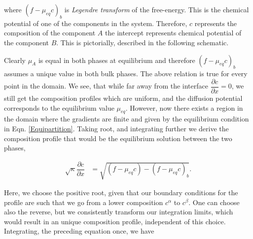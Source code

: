 \documentclass[english]{iambook}
\begin{document}
where $\left(f - \mu_{eq}c\right)_b$ is \textit{Legendre transform} of
the free-energy. This is the chemical potential of one of the components
in the system. Therefore, $c$ represents the composition of the 
component $A$ the intercept represents chemical potential of
the component $B$. This is pictorially, described in the following
schematic.

 \begin{center}
  \end{center}

Clearly $\mu_A$ is equal in both phases at equilibrium
and therefore $\left(f - \mu_{eq}c\right)_b$ assumes
a unique value in both bulk phases. The above relation 
is true for every point in the domain.  We see, that while
far away from the interface $\dfrac{\partial c}{\partial x} =0$,
we still get the composition profiles which are uniform, 
and the diffusion potential corresponds to the equilibrium
value $\mu_{eq}$. However, now there exists a region in 
the domain where the gradients are finite and given by
the equilibrium condition in Eqn. \ref{Equipartition}.
Taking root, and integrating further we derive the 
composition profile that would be the equilibrium 
solution between the two phases, 

\begin{align}
 \sqrt{\kappa}\dfrac{\partial c}{\partial x} &=  \sqrt{\left(f - \mu_{eq}c\right) - \left(f - \mu_{eq}c\right)_b}.
 \label{composition_profile}
\end{align}

Here, we choose the positive root, given that our boundary conditions
for the profile are such that we go from a lower composition $c^{\alpha}$
to $c^{\beta}$. One can choose also the reverse, but we consistently
transform our integration limits, which would result in an unique 
composition profile, independent of this choice. Integrating, the 
preceding equation once, we have 
\end{document}
